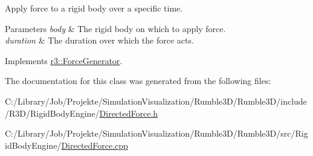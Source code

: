 Apply force to a rigid body over a specific time. 


\begin{DoxyParams}{Parameters}
{\em body} & The rigid body on which to apply force. \\
\hline
{\em duration} & The duration over which the force acts. \\
\hline
\end{DoxyParams}


Implements \mbox{\hyperlink{classr3_1_1_force_generator_a69bebbde8cef792d6636af50037af2aa}{r3\+::\+Force\+Generator}}.



The documentation for this class was generated from the following files\+:\begin{DoxyCompactItemize}
\item 
C\+:/\+Library/\+Job/\+Projekte/\+Simulation\+Visualization/\+Rumble3\+D/\+Rumble3\+D/include/\+R3\+D/\+Rigid\+Body\+Engine/\mbox{\hyperlink{_directed_force_8h}{Directed\+Force.\+h}}\item 
C\+:/\+Library/\+Job/\+Projekte/\+Simulation\+Visualization/\+Rumble3\+D/\+Rumble3\+D/src/\+Rigid\+Body\+Engine/\mbox{\hyperlink{_directed_force_8cpp}{Directed\+Force.\+cpp}}\end{DoxyCompactItemize}
